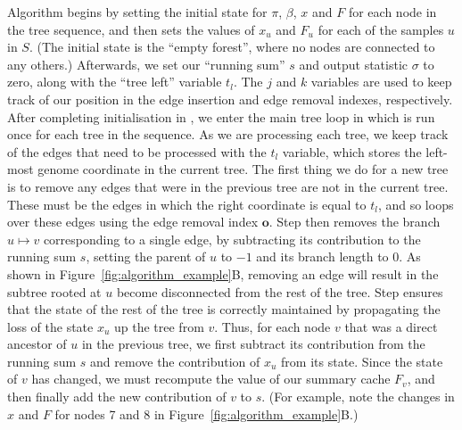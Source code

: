 \documentclass{article}
\newcommand{\indexout}[0]{\ensuremath{\mathbf{o}}}
\begin{document}
Algorithm  begins by setting the initial state for $\pi$, $\beta$,
$x$ and $F$ for each node in the tree sequence, and then sets the values
of $x_u$ and $F_u$ for each of the samples $u$ in $S$.
(The initial state is the ``empty forest'', where no nodes are connected to any others.)
Afterwards, we set our ``running sum'' $s$ and output statistic $\sigma$ to zero, along
with the ``tree left'' variable $t_l$. The $j$ and $k$ variables are
used to keep track of our position in the edge insertion and edge
removal indexes, respectively. After completing initialisation in
, we enter the main tree loop in  which is
run once for each tree in the sequence. As we are processing each
tree, we keep track of the edges that need to be processed with
the $t_l$ variable, which stores the left-most genome coordinate
in the current tree. The first thing we do for a new tree is to
remove any edges that were in the previous tree are not in the
current tree. These must be the edges in which the right coordinate
is equal to $t_l$, and so  loops over these edges using
the edge removal index $\indexout$. Step  then removes
the branch $u \mapsto v$ corresponding to a single edge, by
subtracting its contribution to the running sum $s$, setting the parent of
$u$ to $-1$ and its branch length to $0$. As shown in
Figure~\ref{fig:algorithm_example}B, removing an edge will result
in the subtree rooted at $u$ become disconnected from the rest of the
tree. Step  ensures that the state of the rest of the tree
is correctly maintained by propagating the loss of the state $x_u$
up the tree from $v$. Thus, for each node $v$ that was a
direct ancestor of $u$ in the previous tree, we first subtract
its contribution from the running sum $s$ and remove the contribution
of $x_u$ from its state. Since the state of $v$ has changed, we must
recompute the value of our summary cache $F_v$, and then finally
add the new contribution of $v$ to $s$. (For example, note the changes in $x$
and $F$ for nodes 7 and 8 in Figure~\ref{fig:algorithm_example}B.)
\end{document}
